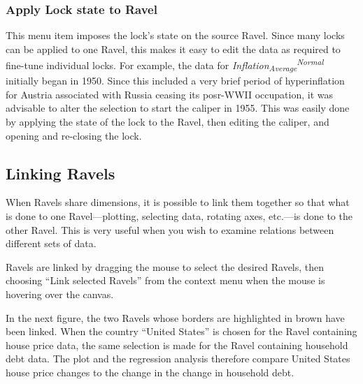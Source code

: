 \subsubsection{Apply Lock state to Ravel}

This menu item imposes the lock's state on the source Ravel. Since
many locks can be applied to one Ravel, this makes it easy to edit
the data as required to fine-tune individual locks. For example, the
data for \emph{Inflation}\textsubscript{\emph{Average}}\emph{}\textsuperscript{\emph{Normal}}
initially began in 1950. Since this included a very brief period of
hyperinflation for Austria associated with Russia ceasing its posr-WWII
occupation, it was advisable to alter the selection to start the caliper
in 1955. This was easily done by applying the state of the lock to
the Ravel, then editing the caliper, and opening and re-closing the
lock.

\subsection{Linking Ravels \label{Linking-Ravels}}

When Ravels share dimensions, it is possible to link them together
so that what is done to one Ravel---plotting, selecting data, rotating
axes, etc.---is done to the other Ravel. This is very useful when
you wish to examine relations between different sets of data.

Ravels are linked by dragging the mouse to select the desired Ravels,
then choosing ``Link selected Ravels'' from the context menu when
the mouse is hovering over the canvas.

In the next figure, the two Ravels whose borders are highlighted in
brown have been linked. When the country ``United States'' is chosen
for the Ravel containing house price data, the same selection is made
for the Ravel containing household debt data. The plot and the regression
analysis therefore compare United States house price changes to the
change in the change in household debt.

